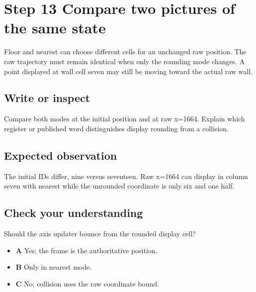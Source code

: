 \section{Step 13 Compare two pictures of the same state}\label{ball-s13}

Floor and nearest can choose different cells for an unchanged raw position. The raw trajectory must remain identical when only the rounding mode changes. A point displayed at wall cell seven may still be moving toward the actual raw wall.

\subsection{Write or inspect}
Compare both modes at the initial position and at raw x=1664. Explain which register or published word distinguishes display rounding from a collision.

\subsection{Expected observation}
The initial IDs differ, nine versus seventeen. Raw x=1664 can display in column seven with nearest while the unrounded coordinate is only six and one half.

\subsection{Check your understanding}
Should the axis updater bounce from the rounded display cell?

\begin{itemize}
  \item \textbf{A} Yes; the frame is the authoritative position.
  \item \textbf{B} Only in nearest mode.
  \item \textbf{C} No; collision uses the raw coordinate bound.
\end{itemize}

